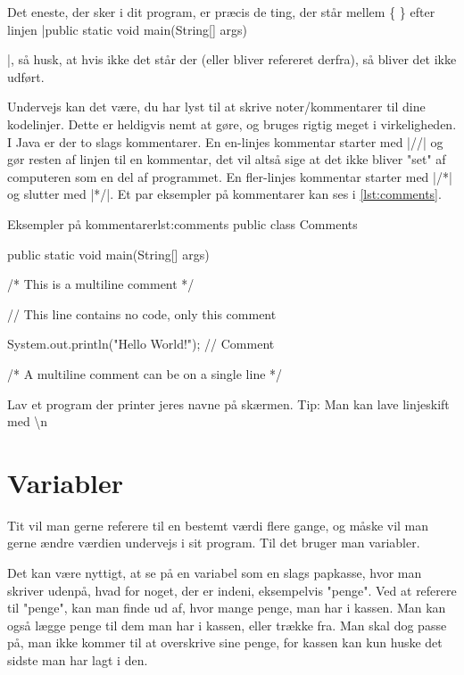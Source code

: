 Det eneste, der sker i dit program, er præcis de ting, der står mellem \{ \} efter linjen \JavaInline|public static void main(String[] args) {|, så husk, at hvis ikke det står der (eller bliver refereret derfra), så bliver det ikke udført.

\begin{remark}
	Undervejs kan det være, du har lyst til at skrive noter/kommentarer til dine kodelinjer. Dette er heldigvis nemt at gøre, og bruges rigtig meget i virkeligheden. I Java er der to slags kommentarer. En en-linjes kommentar starter med \JavaInline|//| og gør resten af linjen til en kommentar, det vil altså sige at det ikke bliver "set" af computeren som en del af programmet. En fler-linjes kommentar starter med \JavaInline|/*| og slutter med \JavaInline|*/|. Et par eksempler på kommentarer kan ses i \autoref{lst:comments}.
\end{remark}

\begin{JavaCode}{Eksempler på kommentarer}{lst:comments}
	public class Comments {
		public static void main(String[] args) {
			/*
			This 
			is
			a 
			multiline 
			comment
			*/
			
			// This line contains no code, only this comment
			
			System.out.println("Hello World!");	// Comment
			
			/* A multiline comment can be on a single line */
		}
	}
\end{JavaCode}

\begin{exercise}
	Lav et program der printer jeres navne på skærmen. 
	Tip: Man kan lave linjeskift med \textbackslash n
\end{exercise}

\section{Variabler}
Tit vil man gerne referere til en bestemt værdi flere gange, og måske vil man gerne ændre værdien undervejs i sit program. Til det bruger man variabler. 

Det kan være nyttigt, at se på en variabel som en slags papkasse, hvor man skriver udenpå, hvad for noget, der er indeni, eksempelvis "penge". Ved at referere til "penge", kan man finde ud af, hvor mange penge, man har i kassen. Man kan også lægge penge til dem man har i kassen, eller trække fra. Man skal dog passe på, man ikke kommer til at overskrive sine penge, for kassen kan kun huske det sidste man har lagt i den.

}
